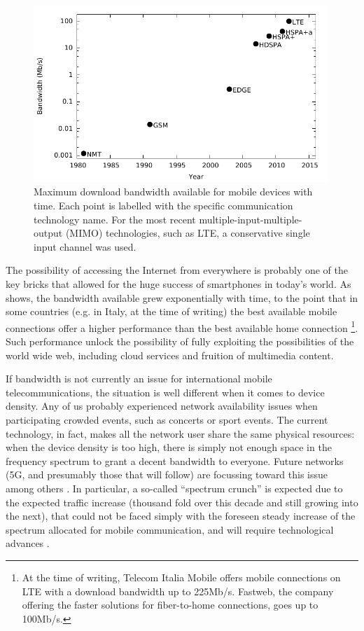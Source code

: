 \documentclass[12pt,a4paper,twoside,openright]{book}
\begin{document}
\begin{figure}
	\centering
	\includegraphics[width=0.99\textwidth]{img/charts/mobile-data-performance}
	\caption{
		Maximum download bandwidth available for mobile devices with time.
		Each point is labelled with the specific communication technology name.
		For the most recent multiple-input-multiple-output (MIMO) technologies, such as LTE, a conservative single input channel was used.
	}
	\label{img:mobile-bandwidth}
\end{figure}

The possibility of accessing the Internet from everywhere is probably one of the key bricks that allowed for the huge success of smartphones in today's world.
%
As  shows, the bandwidth available grew exponentially with time, to the point that in some countries (e.g. in Italy, at the time of writing) the best available mobile connections offer a higher performance than the best available home connection
%
\footnote{At the time of writing, Telecom Italia Mobile offers mobile connections on LTE with a download bandwidth up to 225Mb/s.
%
Fastweb, the company offering the faster solutions for fiber-to-home connections, goes up to 100Mb/s.}.
%
Such performance unlock the possibility of fully exploiting the possibilities of the world wide web, including cloud services and fruition of multimedia content.

If bandwidth is not currently an issue for international mobile telecommunications, the situation is well different when it comes to device density.
%
Any of us probably experienced network availability issues when participating crowded events, such as concerts or sport events.
%
The current technology, in fact, makes all the network user share the same physical resources: when the device density is too high, there is simply not enough space in the frequency spectrum to grant a decent bandwidth to everyone.
%
Future networks (5G, and presumably those that will follow) are focussing toward this issue among others \cite{5g}.
%
In particular, a so-called ``spectrum crunch'' is expected due to the expected traffic increase (thousand fold over this decade and still growing into the next), that could not be faced simply with the foreseen steady increase of the spectrum allocated for mobile communication, and will require technological advances \cite{spectrum-crunch}.
\end{document}

